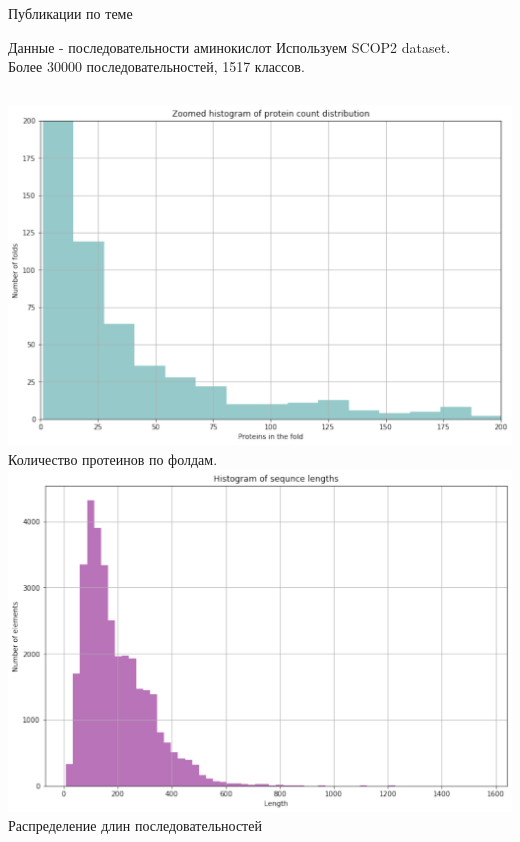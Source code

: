 \documentclass{beamer}
\begin{document}
\begin{frame}{Публикации по теме}
\nocite{*}


\end{frame}




\begin{frame}{Данные - последовательности аминокислот}
Используем SCOP2 dataset. \\Более 30000 последовательностей, 1517 классов.
\\

\begin{columns}[c]
\includegraphics[width=1.0\textwidth]{figures/figure3.pdf}
    Количество протеинов по фолдам.
\includegraphics[width=1.0\textwidth]{figures/figure4.pdf}
    Распределение длин последовательностей
\end{columns}


\end{frame}
\end{document}
